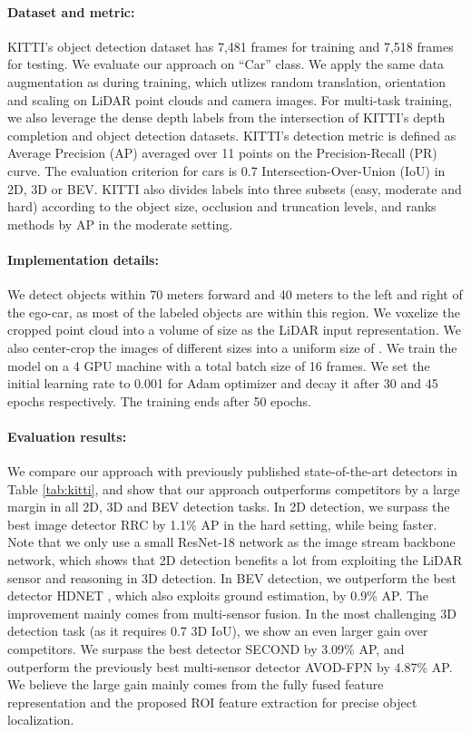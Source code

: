 \documentclass[10pt,twocolumn,letterpaper]{article}
\begin{document}
\paragraph{Dataset and metric:}
KITTI's object detection dataset has 7,481 frames for training and 7,518 frames for testing. We evaluate our approach on ``Car'' class. We  apply the same data augmentation as \cite{contfuse} during training, which utlizes random translation, orientation and scaling on LiDAR point clouds and camera images. For multi-task training, we also leverage the dense depth labels from the intersection of KITTI's depth completion  and object detection datasets. KITTI's detection metric is defined as Average Precision (AP) averaged over 11 points on the Precision-Recall (PR) curve. The evaluation criterion for cars is 0.7 Intersection-Over-Union (IoU) in 2D, 3D or BEV. KITTI also divides labels into three subsets (easy, moderate and hard) according to the object size, occlusion and truncation levels, and ranks methods by AP in the moderate setting.

\paragraph{Implementation details:}
We detect objects within 70 meters forward and 40 meters to the left and right of the ego-car, as most of the labeled objects are within this region. We voxelize the cropped point cloud into a volume of size  as the LiDAR input representation. We also center-crop the images of different sizes into a uniform size of . We train the model on a 4 GPU machine with a total batch size of 16 frames. We set the initial learning rate to 0.001 for Adam optimizer \cite{adam} and decay it after 30 and 45 epochs respectively. The training ends after 50 epochs.

\paragraph{Evaluation results:}
We compare our approach with previously published state-of-the-art detectors in Table \ref{tab:kitti}, and show that our approach outperforms competitors by a large margin in all 2D, 3D and BEV detection tasks. In 2D detection, we surpass the  best image detector RRC \cite{rrc} by 1.1\% AP in the hard setting, while being  faster. Note that we only use a small ResNet-18 network as the image stream backbone network, which shows that 2D detection benefits a lot from exploiting the LiDAR sensor and reasoning in 3D detection. In BEV detection, we outperform the  best detector HDNET \cite{hdnet}, which also exploits ground estimation, by 0.9\% AP. The improvement mainly comes from multi-sensor fusion. In the most challenging 3D detection task (as it requires 0.7 3D IoU), we show an even larger gain over competitors. We surpass the  best detector SECOND \cite{second} by 3.09\% AP, and outperform the previously best multi-sensor detector AVOD-FPN \cite{avod} by 4.87\% AP. We believe the large gain mainly comes from the fully fused feature representation and the proposed ROI feature extraction for precise object localization.
\end{document}
